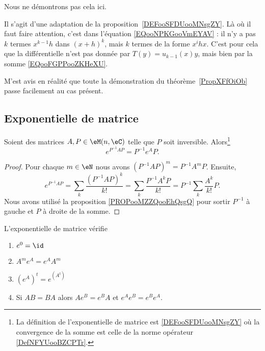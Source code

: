 \begin{normaltext}
	Nous ne démontrons pas cela ici.

	Il s'agit d'une adaptation de la proposition~\ref{DEFooSFDUooMNsgZY}. Là où il faut faire attention, c'est dans l'équation \eqref{EQooNPKGooVmEYAV} : il n'y a pas \( k\) termes \( x^{k-1}h\) dans \( (x+h)^k\), mais \( k\) termes de la forme \( x^ihx\). C'est pour cela que la différentielle n'est pas donnée par \( T(y)=u_{k-1}(x)y\), mais bien par la somme \eqref{EQooFGPPooZKHeXU}.

	M'est avis en réalité que toute la démonstration du théorème~\ref{PropXFfOiOb} passe facilement au cas présent.
\end{normaltext}

\subsection{Exponentielle de matrice}
\label{SECooBYQBooZifJsg}

\begin{proposition}
	Soient des matrices \( A,P\in \eM(n,\eC)\) telle que \( P\) soit inversible. Alors\footnote{La définition de l'exponentielle de matrice est \ref{DEFooSFDUooMNsgZY} où la convergence de la somme est celle de la norme opérateur \ref{DefNFYUooBZCPTr}.}
	\begin{equation}
		e^{P^{-1}AP}=P^{-1} e^{A}P.
	\end{equation}
\end{proposition}

\begin{proof}
	Pour chaque \( m\in \eN\) nous avons \( (P^{-1}AP)^m=P^{-1} A^mP\). Ensuite,
	\begin{equation}
		e^{P^{-1}AP}=\sum_k\frac{(P^{-1}AP)^k}{ k! }=\sum_k\frac{ P^{-1}A^kP }{ k! }=P^{-1}\sum_k\frac{ A^k }{ k! }P.
	\end{equation}
	Nous avons utilisé la proposition \ref{PROPooMZZQooEhQsgQ} pour sortir \( P^{-1}\) à gauche et \( P\) à droite de la somme.
\end{proof}

\begin{proposition}       \label{PROPooFLHPooRhLiZE}
	L'exponentielle de matrice vérifie
	\begin{enumerate}
		\item       \label{ITEMooCVALooEfLQCyI}
		      \( e^0=\id\)
		\item       \label{ITEMooNGPWooIyPEQt}
		      \( A^m e^{A}= e^{A}A^m\)
		\item       \label{ITEMooEOSMooQWjcjA}
		      \( ( e^{A})^t= e^{(A^t)}\)
		\item       \label{ITEMooROPJooMarenu}
		      Si \( AB=BA\) alors \( A e^{B}= e^{B}A\) et \(  e^{A} e^{B}= e^{B} e^{A}\).
	\end{enumerate}
\end{proposition}

